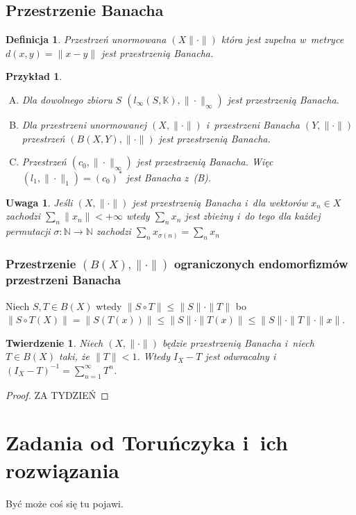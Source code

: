 \documentclass[11pt]{mwrep}
\renewcommand{\[}{\begin{equation}}
\renewcommand{\]}{\end{equation}}
\newcommand{\N}{{\ensuremath{\mathbb N}}}
\newcommand{\K}{\ensuremath{\mathbb{K}}}
\newcommand{\norm}{\|\cdot\|}
\newtheorem{twr}[subsection]{Twierdzenie}%
\newtheorem{uw}[subsection]{Uwaga}
\newtheorem{de}[subsection]{Definicja}
\newtheorem{ex}[subsection]{Przykład}
\newcounter{numer}
\begin{document}
\section{Przestrzenie Banacha}
\begin{de}
	Przestrzeń unormowana $(X\norm )$ która jest zupełna w~metryce $d(x,y) = \|x- y\|$ jest przestrzenią Banacha.
\end{de}
\begin{ex}
	\begin{enumerate}[(A)]
		\item Dla dowolnego zbioru $S$ $\left( l_\infty(S,\K),\norm_\infty \right)$ jest przestrzenią Banacha. 
		\item Dla przestrzeni unormowanej  $(X,\norm)$ i~przestrzeni Banacha $(Y,\norm)$ przestrzeń $\left( B(X,Y), \norm \right)$ 
			jest przestrzenią Banacha.
		\item Przestrzeń $(c_0, \norm_\infty)$ jest przestrzenią Banacha. Więc $(l_1,\norm_1)= (c_0)^*$ jest Banacha  z~(B).
	\end{enumerate}
\end{ex}
\begin{uw}
	Jeśli $(X,\norm)$ jest przestrzenią Banacha i~dla wektorów $x_n \in X$ zachodzi $\sum_n \|x_n\| < +\infty$ wtedy 
	$\sum_n x_n$ jest zbieżny i~do tego dla każdej permutacji $\sigma\colon \N\to\N$ zachodzi $\sum_n x_{\sigma(n)} = \sum_n x_n$
\end{uw}
\subsection{Przestrzenie $(B(X),\norm)$ ograniczonych endomorfizmów przestrzeni Banacha}
Niech $S,T \in B(X)$ wtedy $\|S\circ T\| \le \|S\| \cdot \|T\|$ bo 
$\|S\circ T (X) \|= \| S(T(x))\| \le \|S\|\cdot \|T(x)\| \le \|S\| \cdot \|T\| \cdot \|x\|$.

\begin{twr}
	Niech $(X,\norm)$ będzie przestrzenią Banacha i~niech $T\in B(X)$ taki, że $\|T\| <1$. Wtedy $I_X - T$ jest odwracalny i~
	$\left( I_X - T  \right)^{-1} = \sum_{n=1}^\infty T^n$.
\end{twr}
\begin{proof}
	ZA TYDZIEŃ
\end{proof}
\chapter{Zadania od Toruńczyka i~ich rozwiązania}
Być może coś się tu pojawi.
\end{document}
